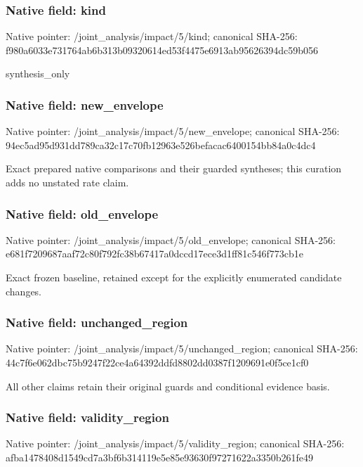 \documentclass[10pt,a4paper]{article}
\begin{document}
\subsubsection{Native field: kind}
Native pointer: /joint\_\allowbreak{}analysis/impact/5/kind; canonical SHA-256: f980a6033e731764ab6b313b09320614ed53f4475e6913ab95626394dc59b056

\begingroup\raggedright\sloppy synthesis\_\allowbreak{}only\par\endgroup

\subsubsection{Native field: new\_\allowbreak{}envelope}
Native pointer: /joint\_\allowbreak{}analysis/impact/5/new\_\allowbreak{}envelope; canonical SHA-256: 94ec5ad95d931dd789ca32c17c70fb12963e526befacac6400154bb84a0c4dc4

\begingroup\raggedright\sloppy Exact prepared native comparisons and their guarded syntheses;\allowbreak{} this curation adds no unstated rate claim.\par\endgroup

\subsubsection{Native field: old\_\allowbreak{}envelope}
Native pointer: /joint\_\allowbreak{}analysis/impact/5/old\_\allowbreak{}envelope; canonical SHA-256: e681f7209687aaf72c80f792fc38b67417a0dccd17ece3d1ff81c546f773cb1e

\begingroup\raggedright\sloppy Exact frozen baseline,\allowbreak{} retained except for the explicitly enumerated candidate changes.\par\endgroup

\subsubsection{Native field: unchanged\_\allowbreak{}region}
Native pointer: /joint\_\allowbreak{}analysis/impact/5/unchanged\_\allowbreak{}region; canonical SHA-256: 44c7f6e062dbc75b9247f22ce4a64392ddfd8802dd0387f1209691e0f5ce1cf0

\begingroup\raggedright\sloppy All other claims retain their original guards and conditional evidence basis.\par\endgroup

\subsubsection{Native field: validity\_\allowbreak{}region}
Native pointer: /joint\_\allowbreak{}analysis/impact/5/validity\_\allowbreak{}region; canonical SHA-256: afba1478408d1549cd7a3bf6b314119e5e85e93630f97271622a3350b261fe49
\end{document}
